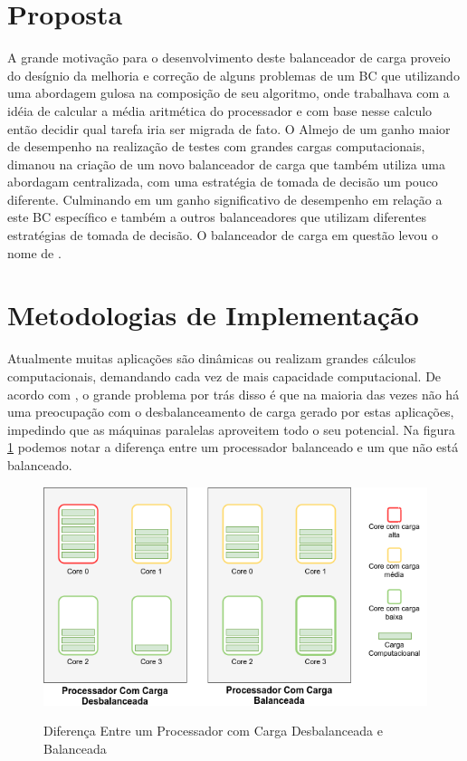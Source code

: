 \section{Proposta}
A grande motivação para o desenvolvimento deste balanceador de carga proveio do desígnio da melhoria e correção de alguns problemas de um BC que utilizando uma abordagem gulosa na composição de seu algoritmo, onde trabalhava com a idéia de calcular a média aritmética do processador e com base nesse calculo então decidir qual tarefa iria ser migrada de fato. O Almejo de um ganho maior de desempenho na realização de testes com grandes cargas computacionais, dimanou na criação de um novo balanceador de carga que também utiliza uma abordagam centralizada, com uma estratégia de tomada de decisão um pouco diferente. Culminando em um ganho significativo de desempenho em relação a este BC específico e também a outros balanceadores que utilizam diferentes estratégias de tomada de decisão. O balanceador de carga em questão levou o nome de \newlb.    


\section{Metodologias de Implementação}

Atualmente muitas aplicações são dinâmicas ou realizam grandes cálculos computacionais, demandando cada vez de mais capacidade computacional. De acordo com \cite{padoin2014saving}, o grande problema por trás disso é que na maioria das vezes não há uma preocupação com o desbalanceamento de carga gerado por estas aplicações, impedindo que as máquinas paralelas aproveitem todo o seu potencial. Na figura \ref{img_load_balance_unbalance} podemos notar a diferença entre um processador balanceado e um que não está balanceado.

\begin{figure}[!htb]
	\centering
	\caption{Diferença Entre um Processador com Carga Desbalanceada e Balanceada}
	\centering
	\includegraphics[scale=0.50]{figuras/load_balance.png}
	\label{img_load_balance_unbalance}
	\centering
\end{figure}

